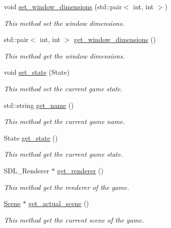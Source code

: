 \begin{DoxyCompactItemize}
void \hyperlink{classengine_1_1_game_ac3dff191e050d6da33c1846ac5590c09}{set\+\_\+window\+\_\+dimensions} (std\+::pair$<$ int, int $>$)
\begin{DoxyCompactList}\small\item\em This method set the window dimensions. \end{DoxyCompactList}\item 
std\+::pair$<$ int, int $>$ \hyperlink{classengine_1_1_game_a212e95896eb7a9685106e410a2d9b90d}{get\+\_\+window\+\_\+dimensions} ()
\begin{DoxyCompactList}\small\item\em This method get the window dimensions. \end{DoxyCompactList}\item 
void \hyperlink{classengine_1_1_game_ad595dcad24a708d07939f050c02048ba}{set\+\_\+state} (State)
\begin{DoxyCompactList}\small\item\em This method set the current game state. \end{DoxyCompactList}\item 
std\+::string \hyperlink{classengine_1_1_game_a66f7b739325c22c7f782a947c83ceb7e}{get\+\_\+name} ()
\begin{DoxyCompactList}\small\item\em This method get the current game name. \end{DoxyCompactList}\item 
State \hyperlink{classengine_1_1_game_a3f1612365d0fa381d548294547efd105}{get\+\_\+state} ()
\begin{DoxyCompactList}\small\item\em This method get the current game state. \end{DoxyCompactList}\item 
S\+D\+L\+\_\+\+Renderer $\ast$ \hyperlink{classengine_1_1_game_a33c49c9cc938553b2458416c2ec2df5f}{get\+\_\+renderer} ()
\begin{DoxyCompactList}\small\item\em This method get the renderer of the game. \end{DoxyCompactList}\item 
\hyperlink{classengine_1_1_scene}{Scene} $\ast$ \hyperlink{classengine_1_1_game_ab8cb027a9a2b23ed81522b969c7b881c}{get\+\_\+actual\+\_\+scene} ()
\begin{DoxyCompactList}\small\item\em This method get the current scene of the game. \end{DoxyCompactList}\end{DoxyCompactItemize}

